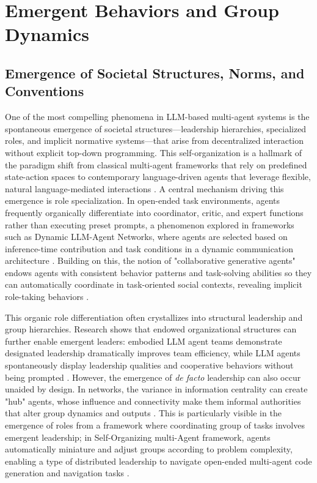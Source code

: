 \documentclass[11pt,a4paper]{article}
\begin{document}
\section{Emergent Behaviors and Group Dynamics}



\subsection{Emergence of Societal Structures, Norms, and Conventions}


One of the most compelling phenomena in LLM-based multi-agent systems is the spontaneous emergence of societal structures---leadership hierarchies, specialized roles, and implicit normative systems---that arise from decentralized interaction without explicit top-down programming. This self-organization is a hallmark of the paradigm shift from classical multi-agent frameworks that rely on predefined state-action spaces to contemporary language-driven agents that leverage flexible, natural language-mediated interactions \cite{arxiv:2308.11432v5,arxiv:2309.07864v3}. A central mechanism driving this emergence is role specialization. In open-ended task environments, agents frequently organically differentiate into coordinator, critic, and expert functions rather than executing preset prompts, a phenomenon explored in frameworks such as Dynamic LLM-Agent Networks, where agents are selected based on inference-time contribution and task conditions in a dynamic communication architecture \cite{arxiv:2310.02170v1}. Building on this, the notion of "collaborative generative agents" endows agents with consistent behavior patterns and task-solving abilities so they can automatically coordinate in task-oriented social contexts, revealing implicit role-taking behaviors \cite{arxiv:2310.06500v1}.

This organic role differentiation often crystallizes into structural leadership and group hierarchies. Research shows that endowed organizational structures can further enable emergent leaders: embodied LLM agent teams demonstrate designated leadership dramatically improves team efficiency, while LLM agents spontaneously display leadership qualities and cooperative behaviors without being prompted \cite{arxiv:2403.12482v1}. However, the emergence of \emph{de facto} leadership can also occur unaided by design. In networks, the variance in information centrality can create "hub" agents, whose influence and connectivity make them informal authorities that alter group dynamics and outputs \cite{arxiv:2310.02170v1,arxiv:2406.07155v1}. This is particularly visible in the emergence of roles from a framework where coordinating group of tasks involves emergent leadership; in Self-Organizing multi-Agent framework, agents automatically miniature and adjust groups according to problem complexity, enabling a type of distributed leadership to navigate open-ended multi-agent code generation and navigation tasks \cite{arxiv:2404.02183v1,arxiv:2403.08282v2}.
\end{document}
